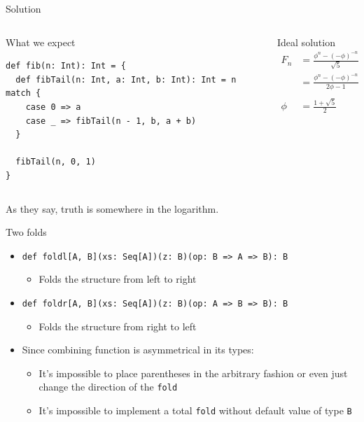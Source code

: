 \documentclass[presentation,aspectratio=169,smaller]{beamer}
\begin{document}
\begin{frame}[label={sec:orgc70ef5b},fragile]{Solution}
 \begin{columns}
\begin{column}[t]{0.5\columnwidth}
\begin{block}{What we expect}
\begin{verbatim}
def fib(n: Int): Int = {
  def fibTail(n: Int, a: Int, b: Int): Int = n match {
    case 0 => a
    case _ => fibTail(n - 1, b, a + b)
  }

  fibTail(n, 0, 1)
}
\end{verbatim}
\end{block}
\end{column}



\begin{column}[t]{0.5\columnwidth}
\begin{block}{Ideal solution}
\begin{align*}
  F_n &= \frac {\phi ^ n - {(- \phi)}^{-n}} {\sqrt{5}} \\
  &= \frac {\phi ^ n - {(- \phi)}^{-n}} {2\phi - 1} \\
  \\
  \phi &= \frac {1 + \sqrt{5}}{2}
\end{align*}

\pause
\end{block}
\end{column}
\end{columns}

As they say, truth is somewhere in the logarithm.
\end{frame}
\begin{frame}[label={sec:org200214d},fragile]{Two folds}
 \begin{itemize}
\item \texttt{def foldl[A, B](xs: Seq[A])(z: B)(op: B => A => B): B}
\begin{itemize}
\item Folds the structure from left to right
\end{itemize}
\item \texttt{def foldr[A, B](xs: Seq[A])(z: B)(op: A => B => B): B}
\begin{itemize}
\item Folds the structure from right to left
\end{itemize}
\item Since combining function is asymmetrical in its types:
\begin{itemize}
\item It’s impossible to place parentheses in the arbitrary fashion or even just
change the direction of the \texttt{fold}
\item It’s impossible to implement a total \texttt{fold} without default value of type \texttt{B}
\end{itemize}
\end{itemize}
\end{frame}
\end{document}
